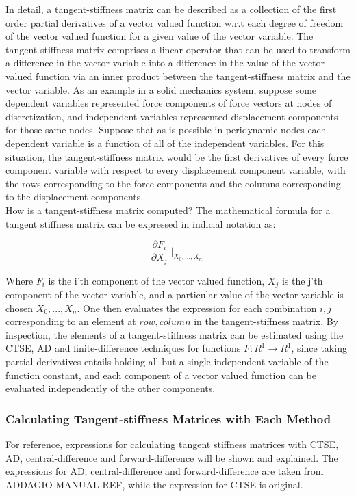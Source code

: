 \documentclass[preprint,12pt]{elsarticle}
\begin{document}
In detail, a tangent-stiffness matrix can be described as a collection of the first
order partial derivatives of a vector valued function w.r.t each degree of freedom of the vector
valued function for a given value of the vector variable.  The tangent-stiffness matrix comprises a
linear operator that can be used to transform a difference in the vector variable into a difference
in the value of the vector valued function via an inner product between the tangent-stiffness matrix
and the vector variable.  As an example in a solid mechanics system, suppose some dependent
variables represented force components of force vectors at nodes of discretization, and independent
variables represented displacement components for those same nodes. Suppose that as is possible in
peridynamic nodes each dependent variable is a function of all of the independent variables. For
this situation, the tangent-stiffness matrix would be the first derivatives of every force component
variable with respect to every displacement component variable, with the rows corresponding to the force
components and the columns corresponding to the displacement components.  \\

How is a tangent-stiffness matrix computed? The mathematical formula for a tangent stiffness matrix
can be expressed in indicial notation as: 

\begin{equation} \frac{\partial F_i}{\partial X_j}\mid_{X_0,...,X_n} \end{equation}

Where $F_i$ is the i'th component of the vector valued function, $X_j$ is the j'th component of the
vector variable, and a particular value of the vector variable is chosen $X_0,...,X_n$. One then
evaluates the expression for each combination $i, j$ corresponding to an element at $row, column$ in
the tangent-stiffness matrix. By inspection, the elements of a tangent-stiffness matrix can be
estimated using the CTSE, AD and finite-difference techniques for functions $F:R^1 \rightarrow R^1$,
since taking partial derivatives entails holding all but a single independent variable of the
function constant, and each component of a vector valued function can be evaluated independently of
the other components. \\

\subsubsection{Calculating Tangent-stiffness Matrices with Each Method}
For reference, expressions for calculating tangent stiffness matrices with CTSE, AD,
central-difference and forward-difference will be shown and explained. The expressions for AD,
central-difference and forward-difference are taken from {ADDAGIO MANUAL REF}, while the expression
for CTSE is original. 
\end{document}
